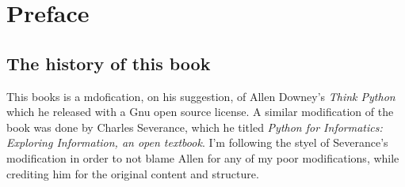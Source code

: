 \chapter{Preface}

\section*{The history of this book}

This books is a mdofication, on his suggestion, of Allen Downey's \emph{Think Python} which he released with a Gnu open source license. A similar modification of the book was done by Charles Severance, which he titled \emph{Python for Informatics: Exploring Information, an open textbook}. I'm following the styel of Severance's modification in order to not blame Allen for any of my poor modifications, while crediting him for the original content and structure.



\normalsize
\clearemptydoublepage

\begin{latexonly}

\tableofcontents

\clearemptydoublepage

\end{latexonly}
